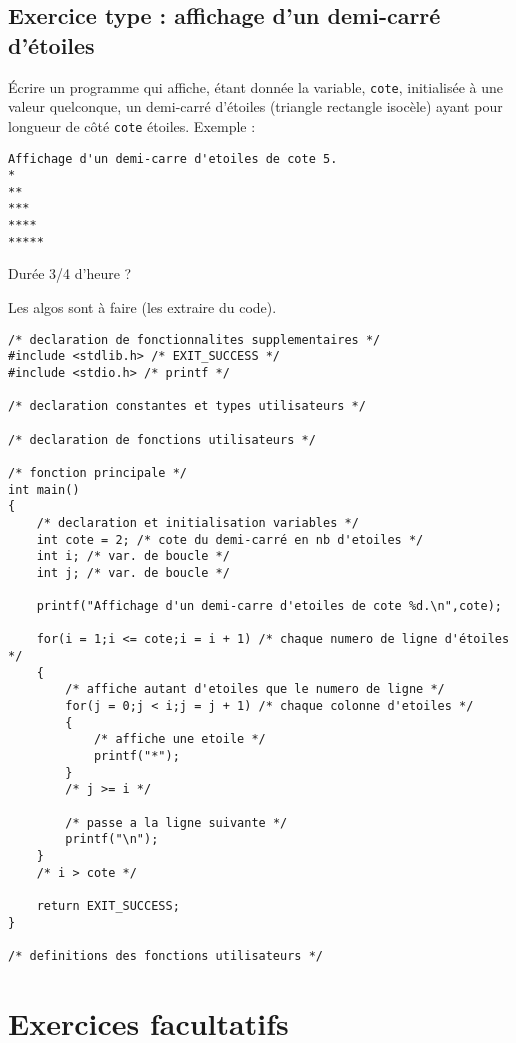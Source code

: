 \subsection{Exercice type : affichage d'un demi-carré d'étoiles}

Écrire un programme qui affiche, étant donnée la variable,
\verb|cote|, initialisée à une valeur quelconque, un demi-carré d'étoiles (triangle rectangle isocèle) ayant pour
longueur de côté \verb|cote| étoiles. Exemple :
\begin{verbatim}
Affichage d'un demi-carre d'etoiles de cote 5.
*
**
***
****
*****
\end{verbatim}

\begin{correction}
Durée 3/4 d'heure ?

Les algos sont à faire (les extraire du code).

\begin{verbatim}
/* declaration de fonctionnalites supplementaires */
#include <stdlib.h> /* EXIT_SUCCESS */
#include <stdio.h> /* printf */

/* declaration constantes et types utilisateurs */

/* declaration de fonctions utilisateurs */

/* fonction principale */
int main()
{
    /* declaration et initialisation variables */
    int cote = 2; /* cote du demi-carré en nb d'etoiles */
    int i; /* var. de boucle */
    int j; /* var. de boucle */

    printf("Affichage d'un demi-carre d'etoiles de cote %d.\n",cote);

    for(i = 1;i <= cote;i = i + 1) /* chaque numero de ligne d'étoiles */
    {
        /* affiche autant d'etoiles que le numero de ligne */
        for(j = 0;j < i;j = j + 1) /* chaque colonne d'etoiles */
        {
            /* affiche une etoile */
            printf("*");
        }
        /* j >= i */

        /* passe a la ligne suivante */
        printf("\n");
    }
    /* i > cote */

    return EXIT_SUCCESS;
}

/* definitions des fonctions utilisateurs */
\end{verbatim}
\end{correction}

\section{Exercices facultatifs}
